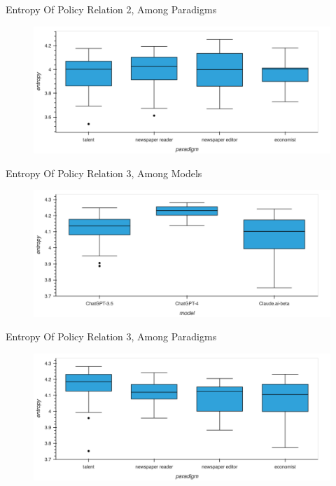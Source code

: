 \documentclass[12pt]{beamer}
\begin{document}
\begin{frame}{Entropy Of Policy Relation 2, Among Paradigms}
\begin{figure}[H]
\centering
\includegraphics[width=11.5cm]{Figures/fig18.png}
\end{figure}
\end{frame}


\begin{frame}{Entropy Of Policy Relation 3, Among Models}
\begin{figure}[H]
\centering
\includegraphics[width=11.5cm]{Figures/fig19.png}
\end{figure}
\end{frame}


\begin{frame}{Entropy Of Policy Relation 3, Among Paradigms}
\begin{figure}[H]
\centering
\includegraphics[width=11.5cm]{Figures/fig20.png}
\end{figure}
\end{frame}
\end{document}
